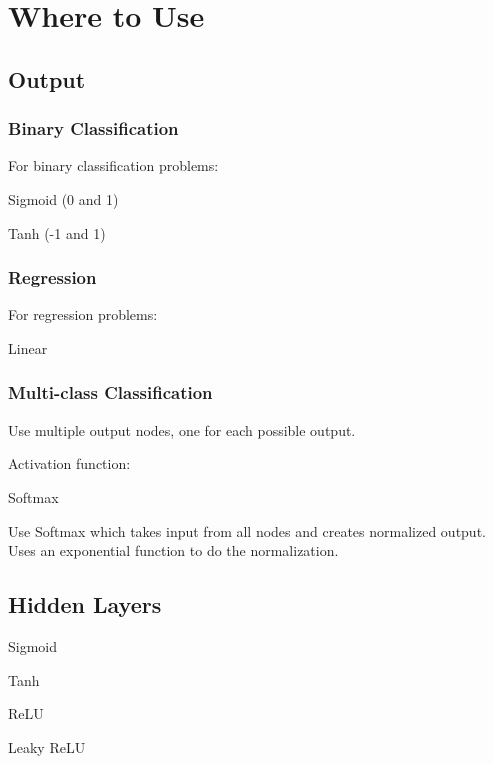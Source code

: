 	\section{Where to Use}
	\subsection{Output}
	\subsubsection{Binary Classification}
For binary classification problems:
	\begin{bulletedlist}
		\item Sigmoid (0 and 1)
		\item Tanh (-1 and 1)
	\end{bulletedlist}

	\subsubsection{Regression}
For regression problems:
	\begin{bulletedlist}
		\item Linear
	\end{bulletedlist}

	\subsubsection{Multi-class Classification}

Use multiple output nodes, one for each possible output.

Activation function:
	\begin{bulletedlist}
		\item Softmax
	\end{bulletedlist}

Use Softmax which takes input from all nodes and creates normalized output.  Uses an exponential function to do the normalization.

	\subsection{Hidden Layers}
	\begin{bulletedlist}
		\item Sigmoid
		\item Tanh
		\item ReLU
		\item Leaky ReLU
	\end{bulletedlist}


